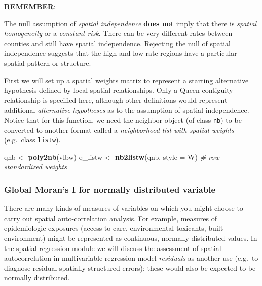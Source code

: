 \documentclass[
]{book}
\newenvironment{Shaded}{\begin{snugshade}}{\end{snugshade}}
\newcommand{\AttributeTok}[1]{\textcolor[rgb]{0.13,0.29,0.53}{#1}}
\newcommand{\CommentTok}[1]{\textcolor[rgb]{0.56,0.35,0.01}{\textit{#1}}}
\newcommand{\FunctionTok}[1]{\textcolor[rgb]{0.13,0.29,0.53}{\textbf{#1}}}
\newcommand{\NormalTok}[1]{#1}
\newcommand{\OtherTok}[1]{\textcolor[rgb]{0.56,0.35,0.01}{#1}}
\newcommand{\StringTok}[1]{\textcolor[rgb]{0.31,0.60,0.02}{#1}}
\newenvironment{rmdnote}[1]
  {
  \begin{itemize}
  \renewcommand{\labelitemi}{
    \raisebox{-.7\height}[0pt][0pt]{
      {\setkeys{Gin}{width=3em,keepaspectratio}\texttt{[image: images/\#1]}}
    }
  }
  \setlength{\fboxsep}{1em}
  \begin{note}
  \item
  }
  {
  \end{note}
  \end{itemize}
  }
\begin{document}
\begin{rmdnote}{note}
\textbf{REMEMBER}:

The null assumption of \emph{spatial independence} \textbf{does not} imply that there is \emph{spatial homogeneity} or a \emph{constant risk}. There can be very different rates between counties and still have spatial independence. Rejecting the null of spatial independence suggests that the high and low rate regions have a particular spatial pattern or structure.

\end{rmdnote}

First we will set up a spatial weights matrix to represent a starting alternative hypothesis defined by local spatial relationships. Only a Queen contiguity relationship is specified here, although other definitions would represent additional \emph{alternative hypotheses} as to the assumption of spatial independence. Notice that for this function, we need the neighbor object (of class \texttt{nb}) to be converted to another format called a \emph{neighborhood list with spatial weights} (e.g.~class \texttt{listw}).

\begin{Shaded}
\begin{Highlighting}[]
\NormalTok{qnb }\OtherTok{\textless{}{-}} \FunctionTok{poly2nb}\NormalTok{(vlbw)}
\NormalTok{q\_listw }\OtherTok{\textless{}{-}} \FunctionTok{nb2listw}\NormalTok{(qnb, }\AttributeTok{style =} \StringTok{\textquotesingle{}W\textquotesingle{}}\NormalTok{) }\CommentTok{\# row{-}standardized weights}
\end{Highlighting}
\end{Shaded}

\hypertarget{global-morans-i-for-normally-distributed-variable}{%
\subsubsection{Global Moran's I for normally distributed variable}\label{global-morans-i-for-normally-distributed-variable}}

There are many kinds of measures of variables on which you might choose to carry out spatial auto-correlation analysis. For example, measures of epidemiologic exposures (access to care, environmental toxicants, built environment) might be represented as continuous, normally distributed values. In the spatial regression module we will discuss the assessment of spatial autocorrelation in multivariable regression model \emph{residuals} as another use (e.g.~to diagnose residual spatially-structured errors); these would also be expected to be normally distributed.
\end{document}
